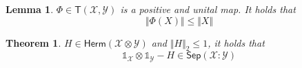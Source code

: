 \documentclass[aps,pra,onecolumn,notitlepage,superscriptaddress]{revtex4-1}
\newcommand{\spc}[1]{\mathcal{#1}}
\newcommand{\Herm}{\mathsf{Herm}}
\newcommand{\Sep}{\mathsf{Sep}}
\newcommand{\T}{\mathsf{T}}
\newcommand\I{\mathds{1}}
\newtheorem{theo}{Theorem}
\newtheorem{lemma}{Lemma}
\begin{document}
    \begin{lemma}
        $\Phi \in \T(\spc X, \spc Y)$ is a positive and unital map. It holds that
        \begin{equation}
            \Vert \Phi(X) \Vert \leq \Vert X \Vert
        \end{equation}
    \end{lemma}

    \begin{theo}
        $H \in \Herm(\spc X \otimes \spc Y)$ and $\Vert H \Vert_2 \leq 1$, it holds that
        \begin{equation}
            \I_\spc X \otimes \I_\spc Y - H \in \Sep(\spc X : \spc Y)
        \end{equation}
    \end{theo}
\end{document}
